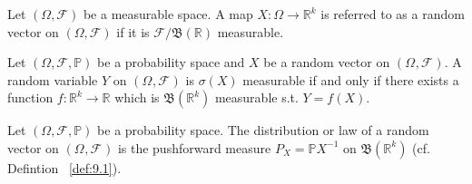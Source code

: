 \begin{definition}
    \label{def:10.3}
    Let $(\Omega, \mathcal{F})$ be a measurable space. A map $X: \Omega \to \mathbb{R}^{k}$ 
    is referred to as a random vector on $(\Omega, \mathcal{F})$ if it is
    $\mathcal{F}/\mathfrak{B}(\mathbb{R})$ measurable.
\end{definition}

\begin{proposition}[]
    \label{prop:10.1}
    Let $(\Omega, \mathcal{F}, \mathbb{P})$ be a probability space and $X$ be a random
    vector on $(\Omega^{ }, \mathcal{F}^{})$. A random variable $Y$ on $(\Omega^{ }, \mathcal{F}^{ })$
    is $\sigma(X)$ measurable if and only if there exists a function
    $f: \mathbb{R}^{k} \to \mathbb{R}$ which is $\mathfrak{B}(\mathbb{R}^{k})$ measurable s.t.
    $Y = f(X)$.
\end{proposition}

\begin{definition}[]
    \label{def:10.4}
    Let $(\Omega, \mathcal{F}, \mathbb{P})$ be a probability space. The distribution or law of
    a random vector on $(\Omega^{ }, \mathcal{F}^{ })$ is the pushforward measure
    $P_X = \mathbb{P} X^{-1}$ on $\mathfrak{B}(\mathbb{R}^{k})$ (cf. Defintion ~\ref{def:9.1}).

\end{definition}





